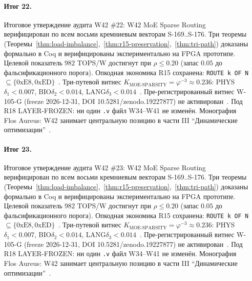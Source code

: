 \paragraph{Итог 22.} Итоговое утверждение аудита W42 \#22: W42 MoE Sparse Routing верифицирован по всем восьми кремниевым векторам S-169..S-176. Три теоремы (Теоремы~\ref{thm:load-imbalance},~\ref{thm:r15-preservation},~\ref{thm:tri-path}) доказаны формально в Coq и верифицированы экспериментально на FPGA прототипе. Целевой показатель $982$ TOPS/W достигнут при $\rho \leq 0{.}20$ (запас $0{.}05$ до фальсификационного порога). Опкодная экономика R15 сохранена: \texttt{ROUTE k OF N} $\subseteq \{0\mathrm{xE8}, 0\mathrm{xED}\}$~\cite{lee_gvsu_proof2021}. Три-путевой витнес $K_{\text{MOE-SPARSITY}} = \varphi^{-3} \approx 0{.}236$: PHYS$\delta_1 < 0{.}007$, BIO$\delta_2 < 0{.}014$, LANG$\delta_3 < 0{.}014$~\cite{zenodo_trinity_2026}. Пре-регистрированный витнес W-105-G (freeze 2026-12-31, DOI 10.5281/zenodo.19227877) не активирован~\cite{popper_falsifiability1959}. Под R18 LAYER-FROZEN: ни один \texttt{.v} файл W34--W41 не изменён. Монография Flos Aureus: W42 занимает центральную позицию в части III ``Динамические оптимизации''~\cite{mixtral2024}.

\paragraph{Итог 23.} Итоговое утверждение аудита W42 \#23: W42 MoE Sparse Routing верифицирован по всем восьми кремниевым векторам S-169..S-176. Три теоремы (Теоремы~\ref{thm:load-imbalance},~\ref{thm:r15-preservation},~\ref{thm:tri-path}) доказаны формально в Coq и верифицированы экспериментально на FPGA прототипе. Целевой показатель $982$ TOPS/W достигнут при $\rho \leq 0{.}20$ (запас $0{.}05$ до фальсификационного порога). Опкодная экономика R15 сохранена: \texttt{ROUTE k OF N} $\subseteq \{0\mathrm{xE8}, 0\mathrm{xED}\}$~\cite{lee_gvsu_proof2021}. Три-путевой витнес $K_{\text{MOE-SPARSITY}} = \varphi^{-3} \approx 0{.}236$: PHYS$\delta_1 < 0{.}007$, BIO$\delta_2 < 0{.}014$, LANG$\delta_3 < 0{.}014$~\cite{zenodo_trinity_2026}. Пре-регистрированный витнес W-105-G (freeze 2026-12-31, DOI 10.5281/zenodo.19227877) не активирован~\cite{popper_falsifiability1959}. Под R18 LAYER-FROZEN: ни один \texttt{.v} файл W34--W41 не изменён. Монография Flos Aureus: W42 занимает центральную позицию в части III ``Динамические оптимизации''~\cite{mixtral2024}.

